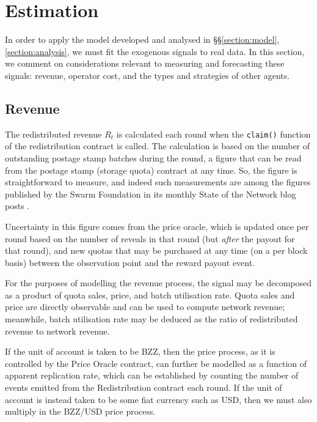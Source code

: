 \section{Estimation}
\label{section:estimation}

In order to apply the model developed and analysed in \S\S\ref{section:model},\ref{section:analysis}, we must fit the exogenous signals to real data.
%
In this section, we comment on considerations relevant to measuring and forecasting these signals: revenue, operator cost, and the types and strategies of other agents.


\subsection{Revenue}
\label{section:revenue}

The redistributed revenue $R_t$ is calculated each round when the \texttt{claim()} function of the redistribution contract is called.
%
The calculation is based on the number of outstanding postage stamp batches during the round, a figure that can be read from the postage stamp (storage quota) contract at any time.
%
So, the figure is straightforward to measure, and indeed such measurements are among the figures published by the Swarm Foundation in its monthly State of the Network blog posts \cite{soft}.

Uncertainty in this figure comes from the price oracle, which is updated once per round based on the number of reveals in that round (but \emph{after} the payout for that round), and new quotas that may be purchased at any time (on a per block basis) between the observation point and the reward payout event.

For the purposes of modelling the revenue process, the signal may be decomposed as a product of quota sales, price, and batch utilisation rate.
%
Quota sales and price are directly observable and can be used to compute network revenue; meanwhile, batch utilisation rate may be deduced as the ratio of redistributed revenue to network revenue.

If the unit of account is taken to be BZZ, then the price process, as it is controlled by the Price Oracle contract, can further be modelled as a function of apparent replication rate, which can be established by counting the number of  events emitted from the Redistribution contract each round.
%
If the unit of account is instead taken to be some fiat currency such as USD, then we must also multiply in the BZZ/USD price process.



